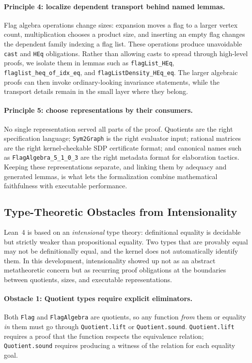 \documentclass{article}
\newcommand{\lean}[1]{\texttt{#1}}
\begin{document}
\paragraph{Principle 4: localize dependent transport behind named lemmas.}
Flag algebra operations change sizes: expansion moves a flag to a larger
vertex count, multiplication chooses a product size, and inserting an empty
flag changes the dependent family indexing a flag list.  These operations
produce unavoidable \lean{cast} and \lean{HEq} obligations.  Rather than
allowing casts to spread through high-level proofs, we isolate them in lemmas
such as \lean{flagList\_HEq}, \lean{flaglist\_heq\_of\_idx\_eq}, and
\lean{flagListDensity\_HEq\_eq}.  The larger algebraic proofs can then invoke
ordinary-looking invariance statements, while the transport details remain in
the small layer where they belong.

\paragraph{Principle 5: choose representations by their consumers.}
No single representation served all parts of the proof.  Quotients are the
right specification language; \lean{Sym2Graph} is the right evaluator input;
rational matrices are the right kernel-checkable SDP certificate format; and
canonical names such as \lean{FlagAlgebra\_5\_1\_0\_3} are the right metadata
format for elaboration tactics.  Keeping these representations separate, and
linking them by adequacy and generated lemmas, is what lets the formalization
combine mathematical faithfulness with executable performance.


\subsection{Type-Theoretic Obstacles from Intensionality}
\label{sec:intensional}

Lean~4 is based on an \emph{intensional} type theory: definitional equality is
decidable but strictly weaker than propositional equality.  Two types that are
provably equal may not be definitionally equal, and the kernel does not
automatically identify them.  In this development, intensionality showed up
not as an abstract metatheoretic concern but as recurring proof obligations at
the boundaries between quotients, sizes, and executable representations.

\paragraph{Obstacle 1: Quotient types require explicit eliminators.}
Both \lean{Flag} and \lean{FlagAlgebra} are quotients, so any function
\emph{from} them or equality \emph{in} them must go through
\lean{Quotient.lift} or \lean{Quotient.sound}.  \lean{Quotient.lift} requires
a proof that the function respects the equivalence relation; \lean{Quotient.sound}
requires producing a witness of the relation for each equality goal.
\end{document}
